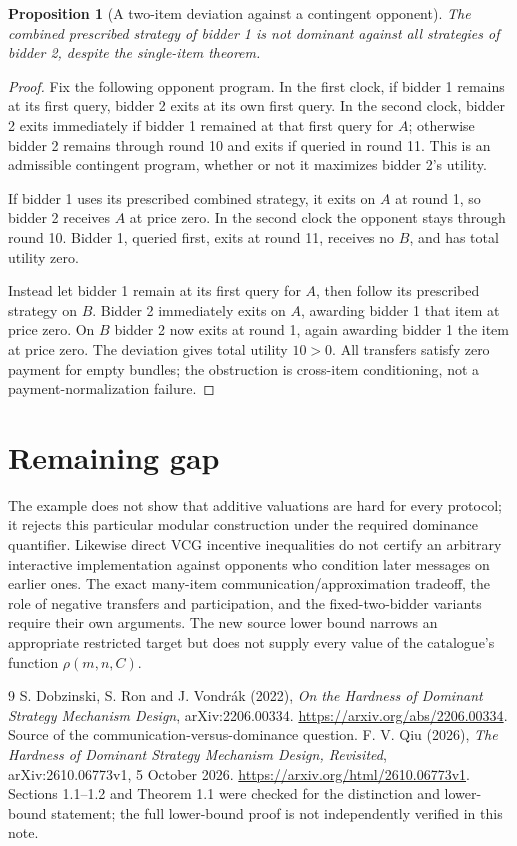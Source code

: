 \documentclass[11pt]{article}
\newtheorem{proposition}[theorem]{Proposition}
\theoremstyle{definition}
\theoremstyle{remark}
\begin{document}
\begin{proposition}[A two-item deviation against a contingent opponent]
The combined prescribed strategy of bidder 1 is not dominant against all strategies of bidder 2, despite the single-item theorem.
\end{proposition}
\begin{proof}
Fix the following opponent program. In the first clock, if bidder 1 remains at its first query, bidder 2 exits at its own first query. In the second clock, bidder 2 exits immediately if bidder 1 remained at that first query for $A$; otherwise bidder 2 remains through round 10 and exits if queried in round 11. This is an admissible contingent program, whether or not it maximizes bidder 2's utility.

If bidder 1 uses its prescribed combined strategy, it exits on $A$ at round 1, so bidder 2 receives $A$ at price zero. In the second clock the opponent stays through round 10. Bidder 1, queried first, exits at round 11, receives no $B$, and has total utility zero.

Instead let bidder 1 remain at its first query for $A$, then follow its prescribed strategy on $B$. Bidder 2 immediately exits on $A$, awarding bidder 1 that item at price zero. On $B$ bidder 2 now exits at round 1, again awarding bidder 1 the item at price zero. The deviation gives total utility $10>0$. All transfers satisfy zero payment for empty bundles; the obstruction is cross-item conditioning, not a payment-normalization failure.
\end{proof}

\section{Remaining gap}
The example does not show that additive valuations are hard for every protocol; it rejects this particular modular construction under the required dominance quantifier. Likewise direct VCG incentive inequalities do not certify an arbitrary interactive implementation against opponents who condition later messages on earlier ones. The exact many-item communication/approximation tradeoff, the role of negative transfers and participation, and the fixed-two-bidder variants require their own arguments. The new source lower bound narrows an appropriate restricted target but does not supply every value of the catalogue's function $\rho(m,n,C)$.

\begin{thebibliography}{9}
 S. Dobzinski, S. Ron and J. Vondr\'ak (2022), \emph{On the Hardness of Dominant Strategy Mechanism Design}, arXiv:2206.00334. \url{https://arxiv.org/abs/2206.00334}. Source of the communication-versus-dominance question.
 F. V. Qiu (2026), \emph{The Hardness of Dominant Strategy Mechanism Design, Revisited}, arXiv:2610.06773v1, 5 October 2026. \url{https://arxiv.org/html/2610.06773v1}. Sections 1.1--1.2 and Theorem 1.1 were checked for the distinction and lower-bound statement; the full lower-bound proof is not independently verified in this note.
\end{thebibliography}
\end{document}

